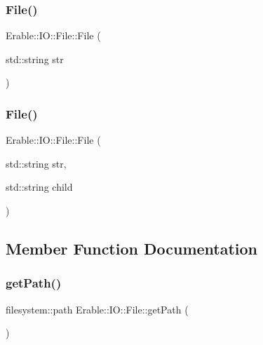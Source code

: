 \subsubsection{\texorpdfstring{File()}{File()}\hspace{0.1cm}{\footnotesize\ttfamily [1/2]}}
{\footnotesize\ttfamily Erable\+::\+I\+O\+::\+File\+::\+File (\begin{DoxyParamCaption}\item[{std\+::string}]{str }\end{DoxyParamCaption})\hspace{0.3cm}{\ttfamily [inline]}}

\mbox{\label{class_erable_1_1_i_o_1_1_file_a1032497e721249b1cacfce0daf8d6cac}} 
\subsubsection{\texorpdfstring{File()}{File()}\hspace{0.1cm}{\footnotesize\ttfamily [2/2]}}
{\footnotesize\ttfamily Erable\+::\+I\+O\+::\+File\+::\+File (\begin{DoxyParamCaption}\item[{std\+::string}]{str,  }\item[{std\+::string}]{child }\end{DoxyParamCaption})\hspace{0.3cm}{\ttfamily [inline]}}



\subsection{Member Function Documentation}
\mbox{\label{class_erable_1_1_i_o_1_1_file_afab30f5dd8c9f1100f2a43c878bf61f1}} 
\subsubsection{\texorpdfstring{getPath()}{getPath()}}
{\footnotesize\ttfamily filesystem\+::path Erable\+::\+I\+O\+::\+File\+::get\+Path (\begin{DoxyParamCaption}{ }\end{DoxyParamCaption})\hspace{0.3cm}{\ttfamily [inline]}}

